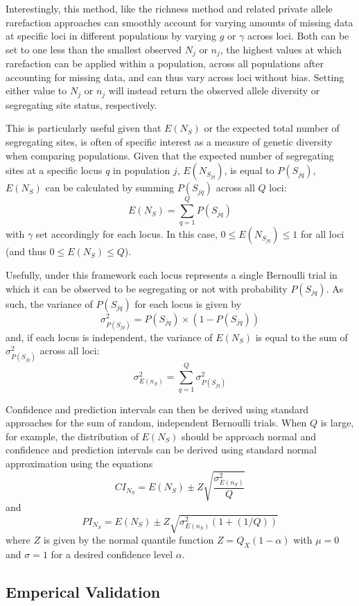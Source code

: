 \documentclass[
  12pt,
]{article}
\begin{document}
Interestingly, this method, like the richness method and related private
allele rarefaction approaches can smoothly account for varying amounts
of missing data at specific loci in different populations by varying
\(g\) or \(\gamma\) across loci. Both can be set to one less than the
smallest observed \(N_{j}\) or \(n_{j}\), the highest values at which
rarefaction can be applied within a population, across all populations
after accounting for missing data, and can thus vary across loci without
bias. Setting either value to \(N_{j}\) or \(n_{j}\) will instead return
the observed allele diversity or segregating site status, respectively.

This is particularly useful given that \(E(N_{S})\) or the expected
total number of segregating sites, is often of specific interest as a
measure of genetic diversity when comparing populations. Given that the
expected number of segregating sites at a specific locus \(q\) in
population \(j\), \(E(N_{S_{jq}})\), is equal to \(P({S_{jq}})\),
\(E(N_{S})\) can be calculated by summing \(P({S_{jq}})\) across all
\(Q\) loci: \[E(N_{S}) = \sum_{q = 1}^{Q} P({S_{jq}})\] with \(\gamma\)
set accordingly for each locus. In this case,
\(0 \le E(N_{S_{jq}}) \le 1\) for all loci (and thus
\(0 \le E(N_{S}) \le Q\)).

Usefully, under this framework each locus represents a single Bernoulli
trial in which it can be observed to be segregating or not with
probability \(P({S_{jq}})\). As such, the variance of \(P({S_{jq}})\)
for each locus is given by
\[\sigma_{P(S_{jq})}^{2} = P(S_{jq}) \times (1 - P(S_{jq}))\] and, if
each locus is independent, the variance of \(E(N_{S})\) is equal to the
sum of \(\sigma_{P(S_{jq})}^{2}\) across all loci:
\[\sigma_{E(n_{S})}^{2} = \sum_{q = 1}^{Q}\sigma_{P(S_{jq})}^{2}\]

Confidence and prediction intervals can then be derived using standard
approaches for the sum of random, independent Bernoulli trials. When
\(Q\) is large, for example, the distribution of \(E(N_{S})\) should be
approach normal and confidence and prediction intervals can be derived
using standard normal approximation using the equations
\[CI_{N_{S}} = E(N_{S}) \pm Z\sqrt{\frac{\sigma_{E(n_{S})}^{2}}{Q}}\]
and \[PI_{N_{S}} = E(N_{S}) \pm Z\sqrt{\sigma_{E(n_{S})}^{2}(1+(1/Q))}\]
where \(Z\) is given by the normal quantile function
\(Z = Q_{X}(1-\alpha)\) with \(\mu = 0\) and \(\sigma = 1\) for a
desired confidence level \(\alpha\).

\hypertarget{emperical-validation}{%
\subsection{Emperical Validation}\label{emperical-validation}}
\end{document}
